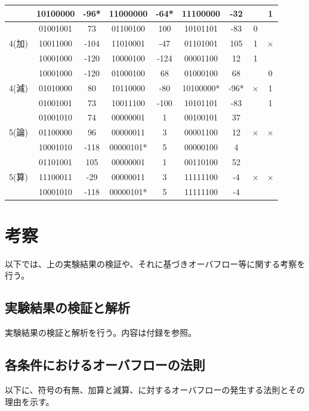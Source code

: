 \documentclass[11pt,a4j]{jsarticle}
\begin{document}
\begin{table}[htb]
\begin{center}
\begin{tabular}{|c|c|c|c|c|c|c|c|c|}
 & 10100000 & -96* & 11000000 & -64* &11100000  &-32  &  & 1 \\ \hline
 &01001001  & 73 &01100100  & 100 & 10101101 & -83 & 0 &  \\ \cline{2-8}
4(加) &  10011000& -104 & 11010001 & -47 & 01101001 &105  & 1 & × \\ \cline{2-8}
 &  10001000&-120  &  10000100& -124 &00001100  & 12 & 1 &  \\ \hline
 &10001000  & -120 & 01000100 & 68 &01000100  & 68 &  & 0 \\ \cline{2-7}\cline{9-9}
4(減) &01010000  & 80 & 10110000 & -80 & 10100000* & -96* & × & 1 \\ \cline{2-7}\cline{9-9}
 &01001001  &73  & 10011100 & -100 &10101101  &-83  &  & 1 \\ \hline
 & 01001010 &74  &00000001  &1  &00100101  & 37 &  &  \\ \cline{2-7}
5(論) &01100000  & 96 & 00000011 & 3 &00001100  &12  & × & × \\ \cline{2-7}
 & 10001010 &-118  & 00000101* &5  & 00000100 &4  &  &  \\ \hline
 &01101001  &105  &00000001  & 1 &00110100  &52  &  &  \\ \cline{2-7}
5(算) & 11100011 & -29 & 00000011 &3  &11111100  &-4  & × & × \\ \cline{2-7}
 & 10001010 & -118 &00000101*  & 5 & 11111100 &-4  &  &  \\ \hline
    \end{tabular}
    \label{tab:1kadai}
  \end{center}
 \end{table}
 
 
 
 \clearpage
 
 
  
 \section{考察}
  以下では、上の実験結果の検証や、それに基づきオーバフロー等に関する考察を行う。
   \subsection{実験結果の検証と解析}
   
   実験結果の検証と解析を行う。内容は付録を参照。
   
   \subsection{各条件におけるオーバフローの法則}
   以下に、符号の有無、加算と減算、に対するオーバフローの発生する法則とその理由を示す。
\end{document}
